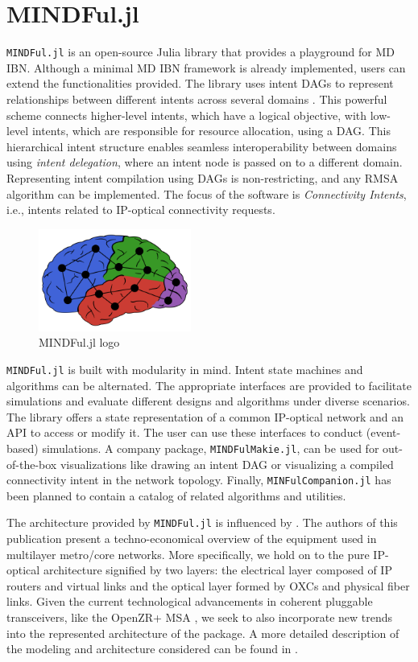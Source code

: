 \documentclass{juliacon}
\begin{document}
\section{MINDFul.jl}
\verb|MINDFul.jl| is an open-source Julia library that provides a playground for \ac{MD} \ac{IBN}.
Although a minimal \ac{MD} \ac{IBN} framework is already implemented, users can extend the functionalities provided.
The library uses intent \acp{DAG} \cite{2023ChristouITG} to represent relationships between different intents across several domains \cite{2023ChristouITNAC}.
This powerful scheme connects higher-level intents, which have a logical objective, with low-level intents, which are responsible for resource allocation, using a \ac{DAG}.
This hierarchical intent structure enables seamless interoperability between domains using \emph{intent delegation}, where an intent node is passed on to a different domain.
Representing intent compilation using \acp{DAG} is non-restricting, and any \ac{RMSA} algorithm can be implemented.
The focus of the software is \emph{Connectivity Intents}, i.e., intents related to IP-optical connectivity requests.

    \begin{figure}[t]
    \centerline{\includegraphics[width=5cm]{logo.pdf}}
    \caption{MINDFul.jl logo}
        \label{fig:logo}
    \end{figure}

\verb|MINDFul.jl| is built with modularity in mind.
Intent state machines and algorithms can be alternated.
The appropriate interfaces are provided to facilitate simulations and evaluate different designs and algorithms under diverse scenarios.
The library offers a state representation of a common IP-optical network and an \ac{API} to access or modify it. 
The user can use these interfaces to conduct (event-based) simulations.
A company package, \verb|MINDFulMakie.jl|, can be used for out-of-the-box visualizations like drawing an intent \ac{DAG} or visualizing a compiled connectivity intent in the network topology.
Finally, \verb|MINFulCompanion.jl| has been planned to contain a catalog of related algorithms and utilities.

The architecture provided by \verb|MINDFul.jl| is influenced by \cite{2013Rambach}.
The authors of this publication present a techno-economical overview of the equipment used in multilayer metro/core networks.
More specifically, we hold on to the pure IP-optical architecture signified by two layers: the electrical layer composed of IP routers and virtual links and the optical layer formed by \acp{OXC} and physical fiber links.
Given the current technological advancements in coherent pluggable transceivers, like the OpenZR+ \ac{MSA} \cite{OpenZRProps}, we seek to also incorporate new trends into the represented architecture of the package.
A more detailed description of the modeling and architecture considered can be found in \cite{2022ChristouPlug}.
\end{document}
